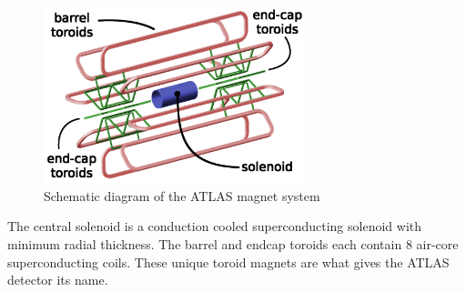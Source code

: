 \begin{figure}[h]
    \centering
    \includegraphics[width=3in]{figures/chapter2/magnets.png}
    \caption{Schematic diagram of the ATLAS magnet system}
    \label{fig:magnets}
\end{figure}

The central solenoid is a conduction cooled superconducting solenoid with minimum radial thickness. The barrel and endcap toroids each contain 8 air-core superconducting coils. These unique toroid magnets are what gives the ATLAS detector its name.